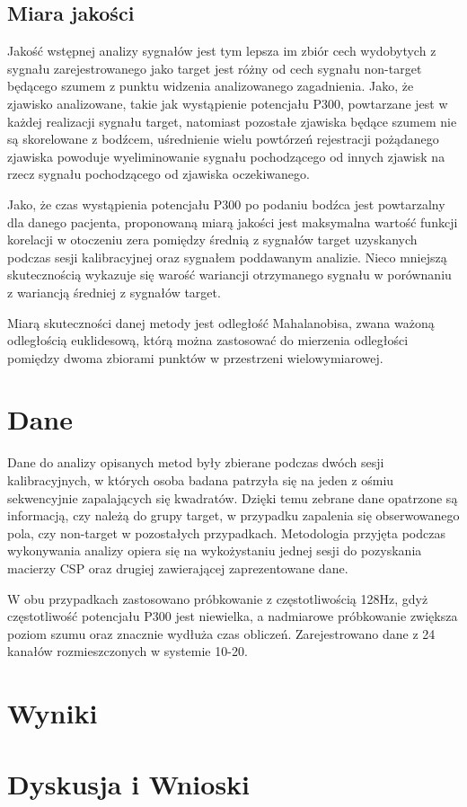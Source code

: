 \documentclass[licencjacka,openright]{pracamgr}
\begin{document}
\section{Miara jakości}
Jakość wstępnej analizy sygnałów jest tym lepsza im zbiór cech wydobytych z sygnału zarejestrowanego jako target jest różny od cech sygnału non-target będącego szumem z punktu widzenia analizowanego zagadnienia. Jako, że zjawisko analizowane, takie jak wystąpienie potencjału P300, powtarzane jest w każdej realizacji sygnału target, natomiast pozostałe zjawiska będące szumem nie są skorelowane z bodźcem, uśrednienie wielu powtórzeń rejestracji pożądanego zjawiska powoduje wyeliminowanie sygnału pochodzącego od innych zjawisk na rzecz sygnału pochodzącego od zjawiska oczekiwanego.

Jako, że czas wystąpienia potencjału P300 po podaniu bodźca jest powtarzalny dla danego pacjenta, proponowaną miarą jakości jest maksymalna wartość funkcji korelacji w otoczeniu zera pomiędzy średnią z sygnałów target uzyskanych podczas sesji kalibracyjnej oraz sygnałem poddawanym analizie. Nieco mniejszą skutecznością wykazuje się warość wariancji otrzymanego sygnału w porównaniu z wariancją średniej z sygnałów target.

Miarą skuteczności danej metody jest odległość Mahalanobisa, zwana ważoną odległością euklidesową, którą można zastosować do mierzenia odległości pomiędzy dwoma zbiorami punktów w przestrzeni wielowymiarowej.

\chapter{Dane}
Dane do analizy opisanych metod były zbierane podczas dwóch sesji kalibracyjnych, w których osoba badana patrzyła się na jeden z ośmiu sekwencyjnie zapalających się kwadratów. Dzięki temu zebrane dane opatrzone są informacją, czy należą do grupy target, w przypadku zapalenia się obserwowanego pola, czy non-target w pozostałych przypadkach. Metodologia przyjęta podczas wykonywania analizy opiera się na wykożystaniu jednej sesji do pozyskania macierzy CSP oraz drugiej zawierającej zaprezentowane dane.

W obu przypadkach zastosowano próbkowanie z częstotliwością 128Hz, gdyż częstotliwość potencjału P300 jest niewielka, a nadmiarowe próbkowanie zwiększa poziom szumu oraz znacznie wydłuża czas obliczeń. Zarejestrowano dane z 24 kanałów rozmieszczonych w systemie 10-20.



\chapter{Wyniki}

\chapter{Dyskusja i Wnioski}



\end{document}
